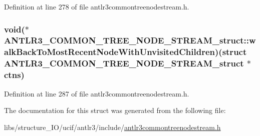 Definition at line 278 of file antlr3commontreenodestream.\-h.

\hypertarget{struct_a_n_t_l_r3___c_o_m_m_o_n___t_r_e_e___n_o_d_e___s_t_r_e_a_m__struct_a42b7aaeffe7b8cd39db1a34631892db2}{
\subsubsection[{walk\-Back\-To\-Most\-Recent\-Node\-With\-Unvisited\-Children}]{\setlength{\rightskip}{0pt plus 5cm}void($\ast$ A\-N\-T\-L\-R3\-\_\-\-C\-O\-M\-M\-O\-N\-\_\-\-T\-R\-E\-E\-\_\-\-N\-O\-D\-E\-\_\-\-S\-T\-R\-E\-A\-M\-\_\-struct\-::walk\-Back\-To\-Most\-Recent\-Node\-With\-Unvisited\-Children)(struct {\bf A\-N\-T\-L\-R3\-\_\-\-C\-O\-M\-M\-O\-N\-\_\-\-T\-R\-E\-E\-\_\-\-N\-O\-D\-E\-\_\-\-S\-T\-R\-E\-A\-M\-\_\-struct} $\ast$ctns)}}\label{struct_a_n_t_l_r3___c_o_m_m_o_n___t_r_e_e___n_o_d_e___s_t_r_e_a_m__struct_a42b7aaeffe7b8cd39db1a34631892db2}


Definition at line 287 of file antlr3commontreenodestream.\-h.



The documentation for this struct was generated from the following file\-:\begin{DoxyCompactItemize}
\item 
libs/structure\-\_\-\-I\-O/ucif/antlr3/include/\hyperlink{antlr3commontreenodestream_8h}{antlr3commontreenodestream.\-h}\end{DoxyCompactItemize}
